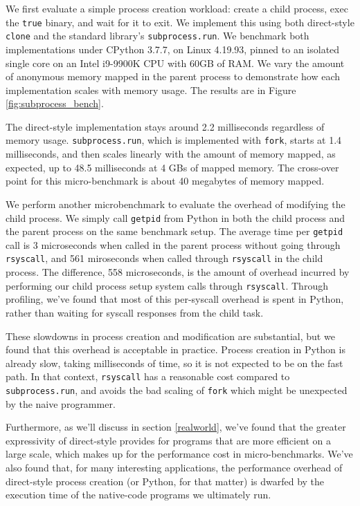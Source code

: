 \documentclass[letterpaper,twocolumn,10pt]{article}
\begin{document}
We first evaluate a simple process creation workload:
create a child process, exec the \texttt{true} binary, and wait for it to exit.
We implement this using both direct-style \texttt{clone}
and the standard library's \texttt{subprocess.run}.
We benchmark both implementations under CPython 3.7.7, on Linux 4.19.93,
pinned to an isolated single core on an Intel i9-9900K CPU with 60GB of RAM.
We vary the amount of anonymous memory mapped in the parent process
to demonstrate how each implementation scales with memory usage.
The results are in Figure \ref{fig:subprocess_bench}.

The direct-style implementation stays around 2.2 milliseconds regardless of memory usage.
\texttt{subprocess.run}, which is implemented with \texttt{fork},
starts at 1.4 milliseconds,
and then scales linearly with the amount of memory mapped, as expected,
up to 48.5 milliseconds at 4 GBs of mapped memory.
The cross-over point for this micro-benchmark is about 40 megabytes of memory mapped.

We perform another microbenchmark to evaluate the overhead of modifying the child process.
We simply call \texttt{getpid} from Python
in both the child process and the parent process on the same benchmark setup.
The average time per \texttt{getpid} call is
3 microseconds when called in the parent process without going through \texttt{rsyscall},
and 561 miroseconds when called through \texttt{rsyscall} in the child process.
The difference, 558 microseconds,
is the amount of overhead incurred
by performing our child process setup system calls through \texttt{rsyscall}.
Through profiling, we've found that most of this per-syscall overhead is spent in Python,
rather than waiting for syscall responses from the child task.

These slowdowns in process creation and modification are substantial,
but we found that this overhead is acceptable in practice.
Process creation in Python is already slow, taking milliseconds of time,
so it is not expected to be on the fast path.
In that context, \texttt{rsyscall} has a reasonable cost compared to \texttt{subprocess.run},
and avoids the bad scaling of \texttt{fork} which might be unexpected by the naive programmer.

Furthermore, as we'll discuss in section \ref{realworld},
we've found that the greater expressivity of direct-style
provides for programs that are more efficient on a large scale,
which makes up for the performance cost in micro-benchmarks.
We've also found that, for many interesting applications,
the performance overhead of direct-style process creation (or Python, for that matter)
is dwarfed by the execution time of the native-code programs we ultimately run.
\end{document}
